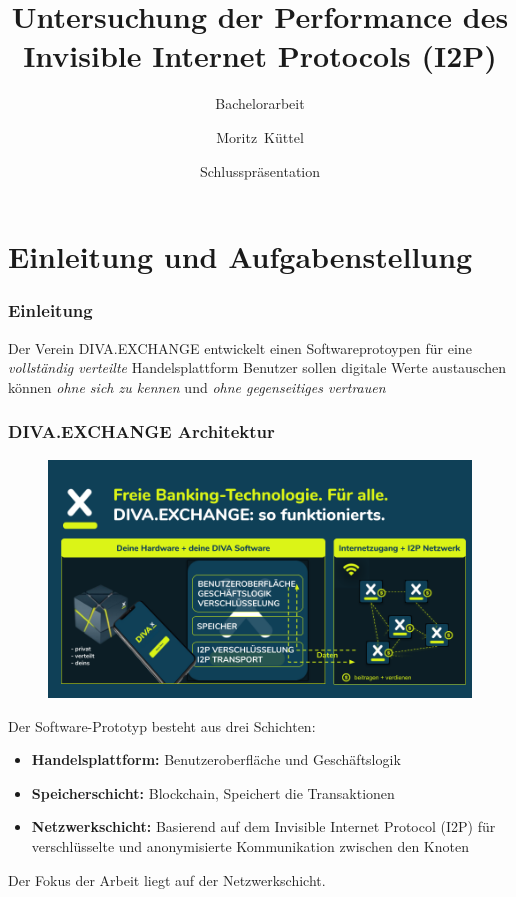 \documentclass{beamer}
\title %
{Untersuchung der Performance des Invisible Internet Protocols (I2P)}
\subtitle{Bachelorarbeit}
\author[mkuettel] %
{Moritz~Küttel}
\institute[Hochschule Luzern Informatik] %
{
  Hochschule Luzern Informatik\newline
  \and
  in Zusammenarbeit mit
  \and
  DIVA.EXCHANGE
}
\date[21.4.2021] %
{
 Schlusspräsentation
}
\begin{document}
    \begin{frame}
        \maketitle
    \end{frame}

\section{Einleitung und Aufgabenstellung}
    \begin{frame}
        \frametitle{Einleitung}
        \begin{center}
            Der Verein DIVA.EXCHANGE entwickelt einen Softwareprotoypen für eine \textit{vollständig verteilte} Handelsplattform
            \vfill
            Benutzer sollen digitale Werte austauschen können
            \vfill
            \textit{ohne sich zu kennen}
            \vfill
            und
            \vfill
            \textit{ohne gegenseitiges vertrauen}
        \end{center}
    \end{frame}




    \begin{frame}[allowframebreaks]
        \frametitle{DIVA.EXCHANGE Architektur}

        \begin{figure}[thp!]
            \includegraphics[width=1.0\textwidth]{img/divax-overview.png}
        \end{figure}


        Der Software-Prototyp besteht aus drei Schichten:

        \begin{itemize}
            \item \textbf{Handelsplattform:} Benutzeroberfläche und Geschäftslogik
            \item \textbf{Speicherschicht:} Blockchain, Speichert die Transaktionen
            \item \textbf{Netzwerkschicht:} Basierend auf dem Invisible Internet Protocol (I2P) für verschlüsselte und anonymisierte Kommunikation zwischen den Knoten
        \end{itemize}

        Der Fokus der Arbeit liegt auf der Netzwerkschicht.
    \end{frame}
\end{document}

